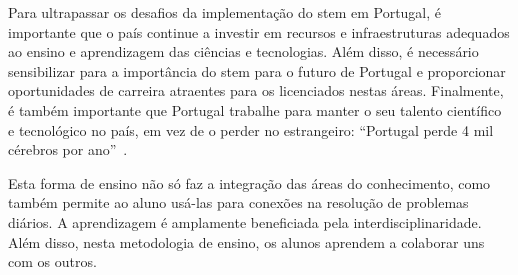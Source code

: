 
Para ultrapassar os desafios da implementação do \acrshort{stem} em Portugal, é importante que o país continue a investir em recursos e infraestruturas adequados ao ensino e aprendizagem das ciências e tecnologias. Além disso, é necessário sensibilizar para a importância do \acrshort{stem} para o futuro de Portugal e proporcionar oportunidades de carreira atraentes para os licenciados nestas áreas. Finalmente, é também importante que Portugal trabalhe para manter o seu talento científico e tecnológico no país, em vez de o perder no estrangeiro: ``Portugal perde 4 mil cérebros por ano''~\cite{Cerdeira2020}.






Esta forma de ensino não só faz a integração das áreas do conhecimento, como também permite ao aluno usá-las para conexões na resolução de problemas diários. A aprendizagem é amplamente beneficiada pela interdisciplinaridade. Além disso, nesta metodologia de ensino, os alunos aprendem a colaborar uns com os outros.

